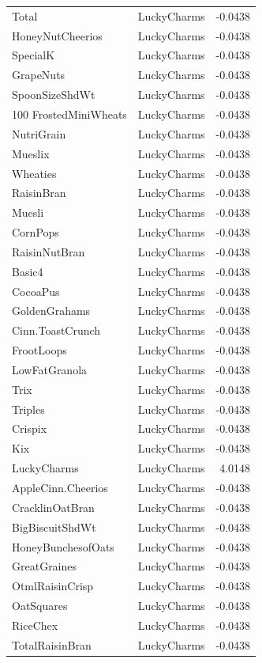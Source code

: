 \begin{longtable}{llr}
Total & LuckyCharms & -0.0438 \\
HoneyNutCheerios & LuckyCharms & -0.0438 \\
SpecialK & LuckyCharms & -0.0438 \\
GrapeNuts & LuckyCharms & -0.0438 \\
SpoonSizeShdWt & LuckyCharms & -0.0438 \\
100%
FrostedMiniWheats & LuckyCharms & -0.0438 \\
NutriGrain & LuckyCharms & -0.0438 \\
Mueslix & LuckyCharms & -0.0438 \\
Wheaties & LuckyCharms & -0.0438 \\
RaisinBran & LuckyCharms & -0.0438 \\
Muesli & LuckyCharms & -0.0438 \\
CornPops & LuckyCharms & -0.0438 \\
RaisinNutBran & LuckyCharms & -0.0438 \\
Basic4 & LuckyCharms & -0.0438 \\
CocoaPus & LuckyCharms & -0.0438 \\
GoldenGrahams & LuckyCharms & -0.0438 \\
Cinn.ToastCrunch & LuckyCharms & -0.0438 \\
FrootLoops & LuckyCharms & -0.0438 \\
LowFatGranola & LuckyCharms & -0.0438 \\
Trix & LuckyCharms & -0.0438 \\
Triples & LuckyCharms & -0.0438 \\
Crispix & LuckyCharms & -0.0438 \\
Kix & LuckyCharms & -0.0438 \\
LuckyCharms & LuckyCharms & 4.0148 \\
AppleCinn.Cheerios & LuckyCharms & -0.0438 \\
CracklinOatBran & LuckyCharms & -0.0438 \\
BigBiscuitShdWt & LuckyCharms & -0.0438 \\
HoneyBunchesofOats & LuckyCharms & -0.0438 \\
GreatGraines & LuckyCharms & -0.0438 \\
OtmlRaisinCrisp & LuckyCharms & -0.0438 \\
OatSquares & LuckyCharms & -0.0438 \\
RiceChex & LuckyCharms & -0.0438 \\
TotalRaisinBran & LuckyCharms & -0.0438 \\

\end{longtable}
